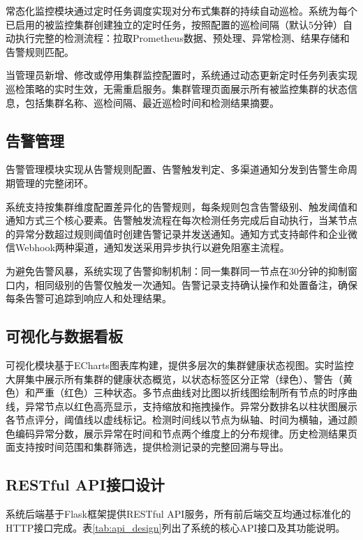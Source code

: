 常态化监控模块通过定时任务调度实现对分布式集群的持续自动巡检。系统为每个已启用的被监控集群创建独立的定时任务，按照配置的巡检间隔（默认5分钟）自动执行完整的检测流程：拉取Prometheus数据、预处理、异常检测、结果存储和告警规则匹配。

当管理员新增、修改或停用集群监控配置时，系统通过动态更新定时任务列表实现巡检策略的实时生效，无需重启服务。集群管理页面展示所有被监控集群的状态信息，包括集群名称、巡检间隔、最近巡检时间和检测结果摘要。

\subsection{告警管理}

告警管理模块实现从告警规则配置、告警触发判定、多渠道通知分发到告警生命周期管理的完整闭环。

系统支持按集群维度配置差异化的告警规则，每条规则包含告警级别、触发阈值和通知方式三个核心要素。告警触发流程在每次检测任务完成后自动执行，当某节点的异常分数超过规则阈值时创建告警记录并发送通知。通知方式支持邮件和企业微信Webhook两种渠道，通知发送采用异步执行以避免阻塞主流程。

为避免告警风暴，系统实现了告警抑制机制：同一集群同一节点在30分钟的抑制窗口内，相同级别的告警仅触发一次通知。告警记录支持确认操作和处置备注，确保每条告警可追踪到响应人和处理结果。

\subsection{可视化与数据看板}

可视化模块基于ECharts图表库构建，提供多层次的集群健康状态视图。实时监控大屏集中展示所有集群的健康状态概览，以状态标签区分正常（绿色）、警告（黄色）和严重（红色）三种状态。多节点曲线对比图以折线图绘制所有节点的时序曲线，异常节点以红色高亮显示，支持缩放和拖拽操作。异常分数排名以柱状图展示各节点评分，阈值线以虚线标记。检测时间线以节点为纵轴、时间为横轴，通过颜色编码异常分数，展示异常在时间和节点两个维度上的分布规律。历史检测结果页面支持按时间范围和集群筛选，提供检测记录的完整回溯与导出。

\subsection{RESTful API接口设计}

系统后端基于Flask框架提供RESTful API服务，所有前后端交互均通过标准化的HTTP接口完成。表\ref{tab:api_design}列出了系统的核心API接口及其功能说明。

